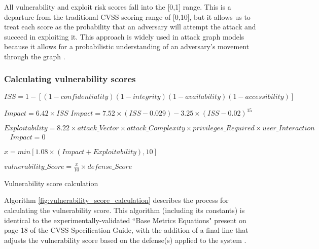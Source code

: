 \documentclass[10pt,journal,compsoc]{IEEEtran}
\begin{document}
\par All vulnerability and exploit risk scores fall into the [0,1] range. This is a departure 
from the traditional CVSS scoring range of [0,10], but it allows us to treat each score as the 
probability that an adversary will attempt the attack and succeed in exploiting it. This approach is 
widely used in attack graph models because it allows for a probabilistic understanding of an 
adversary's movement through the graph \cite{noel2010, aksu2017, ur-rehman2019}.

\subsubsection{Calculating vulnerability scores}
\label{subsubsection:calculate_vulnerability_scores}
\setlength{\algomargin}{0pt} %
\begin{algorithm}[h]
\small
\SetAlgoLined

$ISS = 1-[(1-confidentiality)(1-integrity)(1-availability)(1-accessibility)]$\;

{$Impact = 6.42 \times ISS$\;}
{ $Impact = 7.52 \times (ISS-0.029) - 3.25 \times (ISS-0.02)^{15} $\;}

$Exploitability = 8.22 \times attack\_Vector \times attack\_Complexity \times privileges\_Required \times user\_Interaction$\;
\
{$Impact = 0$\;}

{$x = min[1.08 \times (Impact + Exploitability), 10]$\;}

$vulnerability\_Score = \frac{x}{10} \times defense\_Score$

\caption{Vulnerability score calculation}
\label{fig:vulnerability_score_calculation}
\end{algorithm}

Algorithm \ref{fig:vulnerability_score_calculation} describes the process for calculating the
vulnerability score. This algorithm (including its constants) is identical to the 
experimentally-validated ``Base Metrics Equations" present on page 18 of the CVSS Specification 
Guide, with the addition of a final line that adjusts the vulnerability score based on the 
defense(s) applied to the system \cite{first2019specification}.
\end{document}

